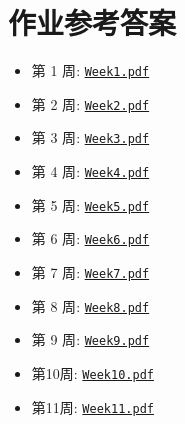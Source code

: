 \documentclass[a4paper,11pt]{article}
\begin{document}
\vspace{-2em}

\section*{\large 作业参考答案}
\vspace{-1em}

\begin{itemize}
    \item {第 1 周}:   \href{https://wanghuaijin.github.io/assets/numDEs/exercises/exercise1.pdf}{\texttt{Week1.pdf}}
    \vspace{-1em}
    \item {第 2 周}: \href{https://wanghuaijin.github.io/assets/numDEs/exercises/exercise2.pdf}{\texttt{Week2.pdf}}
    \vspace{-1em}
    \item {第 3 周}: \href{https://wanghuaijin.github.io/assets/numDEs/exercises/exercise3.pdf}{\texttt{Week3.pdf}}
    \vspace{-1em}
    \item {第 4 周}: \href{https://wanghuaijin.github.io/assets/numDEs/exercises/exercise4.pdf}{\texttt{Week4.pdf}}
    \vspace{-1em}
    \item {第 5 周}: \href{https://wanghuaijin.github.io/assets/numDEs/exercises/exercise5.pdf}{\texttt{Week5.pdf}}
    \vspace{-1em}
     \item {第 6 周}: \href{https://wanghuaijin.github.io/assets/numDEs/exercises/exercise6.pdf}{\texttt{Week6.pdf}}
    \vspace{-1em}
     \item {第 7 周}: \href{https://wanghuaijin.github.io/assets/numDEs/exercises/exercise7.pdf}{\texttt{Week7.pdf}}
    \vspace{-1em}
      \item {第 8 周}: \href{https://wanghuaijin.github.io/assets/numDEs/exercises/exercise8.pdf}{\texttt{Week8.pdf}}
    \vspace{-1em}
     \item {第 9 周}: \href{https://wanghuaijin.github.io/assets/numDEs/exercises/exercise9.pdf}{\texttt{Week9.pdf}}
    \vspace{-1em}
     \item {第10周}: \href{https://wanghuaijin.github.io/assets/numDEs/exercises/exercise10.pdf}{\texttt{Week10.pdf}}
    \vspace{-1em}
    \item {第11周}: \href{https://wanghuaijin.github.io/assets/numDEs/exercises/exercise11.pdf}{\texttt{Week11.pdf}}

\end{itemize}
\end{document}
